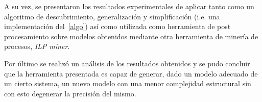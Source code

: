 A su vez, se presentaron los resultados experimentales de aplicar \pachtool tanto como un algoritmo de 
descubrimiento, generalización y simplificación (i.e. una implementación del~\autoref{algo}) así como 
utilizada como herramienta de post procesamiento sobre modelos obtenidos mediante otra herramienta de 
minería de procesos, \textit{ILP miner}.

Por último se realizó un análisis de los resultados obtenidos y se pudo concluir que la herramienta presentada
es capaz de generar, dado un modelo adecuado de un cierto sistema, un nuevo modelo con una menor complejidad 
estructural sin con esto degenerar la precisión del mismo.

